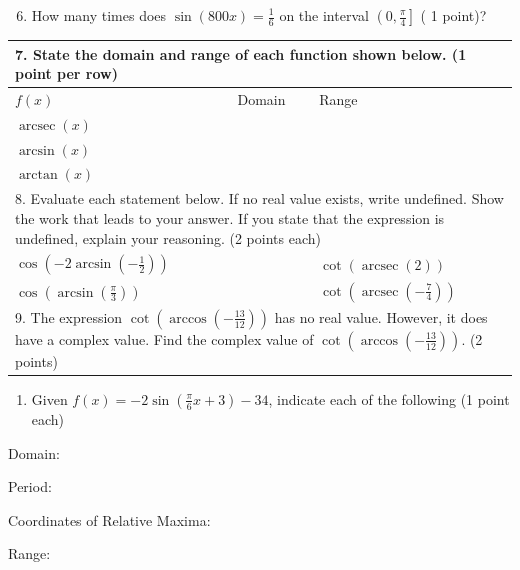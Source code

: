 \documentclass[10pt]{article}
\begin{document}
\begin{enumerate}
  \setcounter{enumi}{5}
  \item How many times does $\sin (800 x)=\frac{1}{6}$ on the interval $\left(0, \frac{\pi}{4}\right]$ ( 1 point)?
\end{enumerate}

\begin{center}
\begin{tabular}{|l|l|l|}
\hline
\multicolumn{3}{|l|}{7. State the domain and range of each function shown below. (1 point per row)} \\
\hline
$f(x)$ & Domain & Range \\
\hline
$\operatorname{arcsec}(x)$ &  &  \\
\hline
$\arcsin (x)$ &  &  \\
\hline
$\arctan (x)$ &  &  \\
\hline
\multicolumn{3}{|l|}{8. Evaluate each statement below. If no real value exists, write undefined. Show the work that leads to your answer. If you state that the expression is undefined, explain your reasoning. (2 points each)} \\
\hline
$\cos \left(-2 \arcsin \left(-\frac{1}{2}\right)\right)$ &  & $\cot (\operatorname{arcsec}(2))$ \\
\hline
$\cos \left(\arcsin \left(\frac{\pi}{3}\right)\right)$ &  & $\cot \left(\operatorname{arcsec}\left(-\frac{7}{4}\right)\right)$ \\
\hline
\multicolumn{3}{|l|}{9. The expression $\cot \left(\arccos \left(-\frac{13}{12}\right)\right)$ has no real value. However, it does have a complex value. Find the complex value of $\cot \left(\arccos \left(-\frac{13}{12}\right)\right)$. (2 points)} \\
\hline
\end{tabular}
\end{center}

\begin{enumerate}
  \item Given $f(x)=-2 \sin \left(\frac{\pi}{6} x+3\right)-34$, indicate each of the following (1 point each)
\end{enumerate}

Domain:

Period:

Coordinates of Relative Maxima:

Range:
\end{document}
